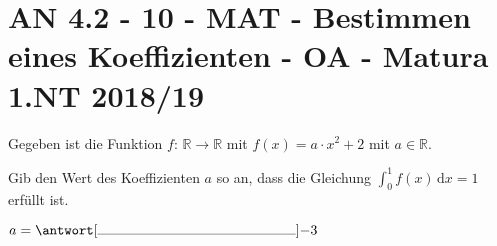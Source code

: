 \section{AN 4.2 - 10 - MAT - Bestimmen eines Koeffizienten - OA - Matura 1.NT 2018/19}

\begin{beispiel}[AN 4.2]{1}
Gegeben ist die Funktion $f$: $\mathbb{R}\rightarrow\mathbb{R}$ mit $f(x)=a\cdot x^2+2$ mit $a\in\mathbb{R}$.

Gib den Wert des Koeffizienten $a$ so an, dass die Gleichung $\displaystyle\int^1_0 f(x)\,\text{d}x=1$ erfüllt ist.\leer

$a=\antwort[\rule{5cm}{0.3pt}]{-3}$
\end{beispiel}